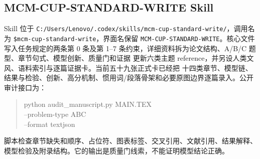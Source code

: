 \subsection{MCM-CUP-STANDARD-WRITE Skill}

Skill 位于
\texttt{C:/Users/Lenovo/.codex/skills/mcm-cup-standard-write/}，调用名为
\texttt{\$mcm-cup-standard-write}，界面名保留
\texttt{MCM-CUP-STANDARD-WRITE}。核心文件写入任务规定的两条第 0 条及第 1--7
条约束，详细资料拆为论文结构、A/B/C 题型、章节句式、模型创新、质量门和证据
更新六类主题 reference，并另设人类文风、语料索引与逐篇证据卡。当前五十九张正式卡已经把
十四类章节、模型链、结果与检验、创新、高分机制、惯用词/段落骨架和必要原图边界逐篇录入。公开审计接口为：
\begin{quote}
\small\ttfamily
python audit\_manuscript.py MAIN.TEX\\
\hspace*{1em}--problem-type A\textbar B\textbar C\\
\hspace*{1em}--format text\textbar json
\end{quote}
脚本检查章节缺失和顺序、占位符、图表标签、交叉引用、文献引用、结果解释、
模型检验及附录结构。它的输出是质量门线索，不能证明模型结论正确。

